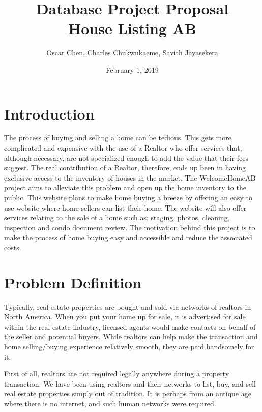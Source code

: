 \documentclass[letterpaper,12pt]{article}
\begin{document}
\title{\Large{\textbf{Database Project Proposal \\ House Listing AB}}}
\author{Oscar Chen, Charles Chukwukaeme, Savith Jayasekera}
\date{February 1, 2019}
\setlength{\droptitle}{-2.5cm}
\maketitle


\section{Introduction}

The process of buying and selling a home can be tedious. This gets more complicated and expensive with the use of a Realtor who offer services that, although necessary, are not specialized enough to add the value that their fees suggest. The real contribution of a Realtor, therefore, ends up been in having exclusive access to the inventory of houses in the market. 
The WelcomeHomeAB project aims to alleviate this problem and open up the home inventory to the public. This website plans to make home buying a breeze by offering an easy to use website where home sellers can list their home. The website will also offer services relating to the sale of a home such as: staging, photos, cleaning, inspection and condo document review.
The motivation behind this project is to make the process of home buying easy and accessible and reduce the associated costs.


\section{Problem Definition}

Typically, real estate properties are bought and sold via networks of realtors in North America. When you put your home up for sale, it is advertised for sale within the real estate industry, licensed agents would make contacts on behalf of the seller and potential buyers. While realtors can help make the transaction and home selling/buying experience relatively smooth, they are paid handsomely for it. 


First of all, realtors are not required legally anywhere during a property transaction. We have been using realtors and their networks to list, buy, and sell real estate properties simply out of tradition. It is perhaps from an antique age where there is no internet, and such human networks were required.
\end{document}
